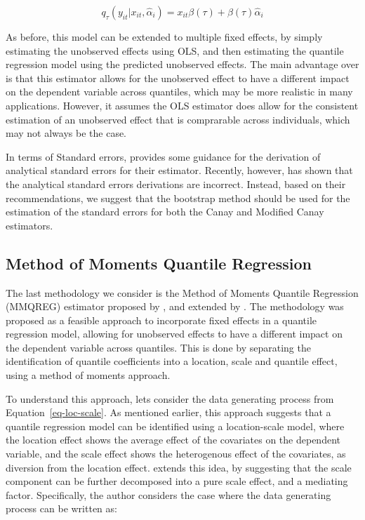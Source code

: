 \documentclass[bib]{statapress}
\begin{document}
\[q_{\tau}(y_{it}|x_{it},\hat \alpha_i) =  x_{it}\beta(\tau)+\beta(\tau) \hat\alpha_i
\]

As before, this model can be extended to multiple fixed effects, by
simply estimating the unobserved effects using OLS, and then estimating
the quantile regression model using the predicted unobserved effects.
The main advantage over \citet{canay2011} is that this estimator allows
for the unobserved effect to have a different impact on the dependent
variable across quantiles, which may be more realistic in many
applications. However, it assumes the OLS estimator does allow for the
consistent estimation of an unobserved effect that is comprarable across
individuals, which may not always be the case.

In terms of Standard errors, \citet{canay2011} provides some guidance
for the derivation of analytical standard errors for their estimator.
Recently, however, \citet{besstremyannaya2019} has shown that the
analytical standard errors derivations are incorrect. Instead, based on
their recommendations, we suggest that the bootstrap method should be
used for the estimation of the standard errors for both the Canay and
Modified Canay estimators.

\subsection{\texorpdfstring{Method of Moments Quantile Regression
\citet{mss2019}}{Method of Moments Quantile Regression @mss2019}}\label{sec-mmqr}

The last methodology we consider is the Method of Moments Quantile
Regression (MMQREG) estimator proposed by \citet{mss2019}, and extended
by \citet{riosavila2024}. The methodology was proposed as a feasible
approach to incorporate fixed effects in a quantile regression model,
allowing for unobserved effects to have a different impact on the
dependent variable across quantiles. This is done by separating the
identification of quantile coefficients into a location, scale and
quantile effect, using a method of moments approach.

To understand this approach, lets consider the data generating process
from Equation~\ref{eq-loc-scale}. As mentioned earlier, this approach
suggests that a quantile regression model can be identified using a
location-scale model, where the location effect shows the average effect
of the covariates on the dependent variable, and the scale effect shows
the heterogenous effect of the covariates, as diversion from the
location effect. \citet{mss2019} extends this idea, by suggesting that
the scale component can be further decomposed into a pure scale effect,
and a mediating factor. Specifically, the author considers the case
where the data generating process can be written as:
\end{document}
